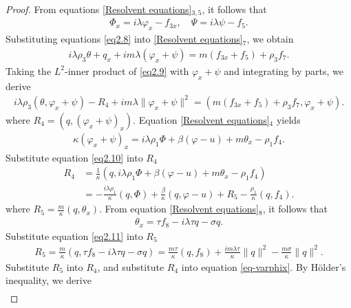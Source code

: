 \documentclass[11pt,reqno]{article}
\begin{document}
  \begin{proof}
  	From equations \eqref{Resolvent equations}$_{3,5}$, it follows that
  	\begin{align} \label{eq2.8}
  		\Phi_{x} = i \lambda \varphi_{x} - f_{3x}, \quad \Psi = i \lambda \psi - f_{5}.
  	\end{align}
  	Substituting equations \eqref{eq2.8} into \eqref{Resolvent equations}$_7$, we obtain
  	\begin{align}\label{eq2.9}
  		i \lambda \rho_{3} \theta + q_x + i m \lambda (\varphi_{x} + \psi) = m (f_{3x} + f_{5}) + \rho_{3} f_{7}.
  	\end{align}
  	Taking the $L^2$-inner product of \eqref{eq2.9} with $\varphi_x+\psi$ and integrating by parts, we derive
  	\begin{align}\label{eq-varphix}
  		i \lambda \rho_3 (\theta, \varphi_x + \psi) - R_4 + i m \lambda \|\varphi_x + \psi\|^2 = (m(f_{3x} + f_5) + \rho_3 f_7, \varphi_x + \psi).
  	\end{align}
  	where $R_4=(q, (\varphi_x + \psi)_x)$.
  	Equation \eqref{Resolvent equations}$_4$ yields
  	\begin{align}\label{eq2.10}
  		\kappa (\varphi_x + \psi)_x = i \lambda \rho_1 \Phi + \beta (\varphi - u) + m \theta_x - \rho_1 f_4.
  	\end{align}
  	Substitute equation \eqref{eq2.10} into $R_4$
  	\begin{align*}
  		R_4 &= \frac{1}{\kappa}(q, i \lambda \rho_1 \Phi + \beta (\varphi - u) + m \theta_x - \rho_1 f_4) \\
  		&= -\frac{i \lambda \rho_1}{\kappa}(q, \Phi) + \frac{\beta}{\kappa}(q, \varphi - u) + R_5 - \frac{\rho_1}{\kappa}(q, f_4).
  	\end{align*}
  	where $R_5=\frac{m}{\kappa}(q, \theta_x)$.
  	From equation \eqref{Resolvent equations}$_8$, it follows that
  	\begin{align}\label{eq2.11}
  		\theta_x = \tau f_8 - i\lambda \tau q - \sigma q.
  	\end{align}
  	Substitute equation \eqref{eq2.11} into $R_5$
  	\begin{align*}
  		R_5 = \frac{m}{\kappa} (q, \tau f_8 - i \lambda \tau q - \sigma q) = \frac{m \tau}{\kappa} (q, f_8) + \frac{i m \lambda \tau}{\kappa} \| q \|^2 - \frac{m \sigma}{\kappa} \| q \|^2.
  	\end{align*}
  	Substitute $R_5$ into $R_4$, and substitute $R_4$ into equation \eqref{eq-varphix}. By H\"older's inequality, we derive
  	\begin{align*}

\end{align*}
\end{proof}
\end{document}
